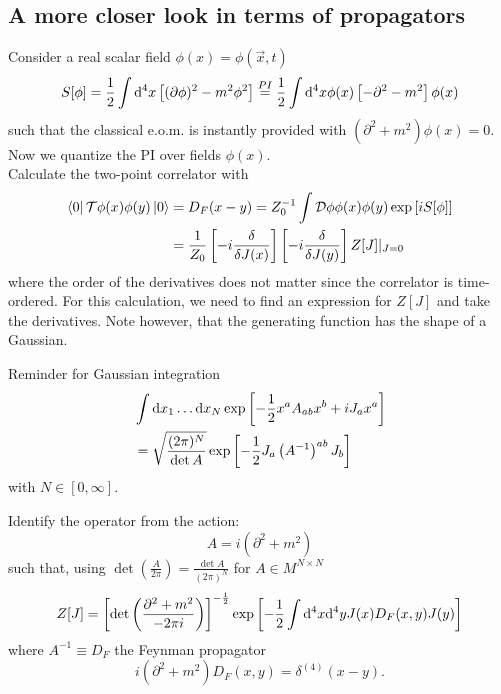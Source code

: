 \subsection{A more closer look in terms of propagators}
Consider a real scalar field $\phi(x)=\phi(\vec{x},t)$
\begin{equation}
	S[\phi] = \frac{1}{2} \int \mathrm{d}^4 x \left[(\partial \phi)^2-m^2\phi^2\right] \stackrel{PI}{=} \frac{1}{2} \int \mathrm{d}^4 x \phi(x) \left[-\partial^2-m^2\right] \phi(x)
\end{equation}
such that the classical e.o.m. is instantly provided with $(\partial^2+m^2)\phi(x) =0$. Now we quantize the PI over fields $\phi(x)$.\\
Calculate the two-point correlator with
\begin{align*}
	\bra{0} \mathcal{T} \phi(x) \phi(y) \ket{0} &= D_F(x-y) =Z^{-1}_0 \int \mathcal{D} \phi \phi(x) \phi(y) \exp\left[i S[\phi]\right] \\
	&= \frac{1}{Z_0} \left[-i \frac{\delta}{\delta J(x)}\right]\left[-i \frac{\delta}{\delta J(y)}\right] Z[J] |_{J=0}
\end{align*}
where the order of the derivatives does not matter since the correlator is time-ordered. For this calculation, we need to find an expression for $Z[J]$ and take the derivatives. Note however, that the generating function has the shape of a Gaussian.\\
\begin{mybox}{Reminder for Gaussian integration}
	\begin{align}
	&\int \mathrm{d} x_1 \dots \mathrm{d} x_N \exp\left[-\frac{1}{2} x^a A_{ab} x^b + i J_a x^a\right] \\
	&= \sqrt{\frac{(2 \pi)^N}{\det A}} \exp \left[- \frac{1}{2} J_a \left(A^{-1}\right)^{ab} J_b\right]\nonumber
	\end{align}
	with $N\in [0,\infty]$.
\end{mybox}
Identify the operator from the action:
\begin{equation*}
	A = i (\partial^2+m^2)
\end{equation*}
such that, using $\det\left(\frac{A}{2 \pi}\right)= \frac{\det A}{(2 \pi)^N}$ for $A\in M^{N\times N}$
\begin{equation*}
	Z[J]=\left[\det\left(\frac{\partial^2+m^2}{-2\pi i}\right)\right]^{-\frac{1}{2}} \exp \left[-\frac{1}{2} \int \mathrm{d}^4x\mathrm{d}^4y J(x) D_F(x,y) J(y)\right]
\end{equation*}
where $A^{-1} \equiv D_F$ the Feynman propagator
\begin{equation*}
	i(\partial^2+m^2) D_F(x,y) = \delta^{(4)}(x-y).
\end{equation*}
